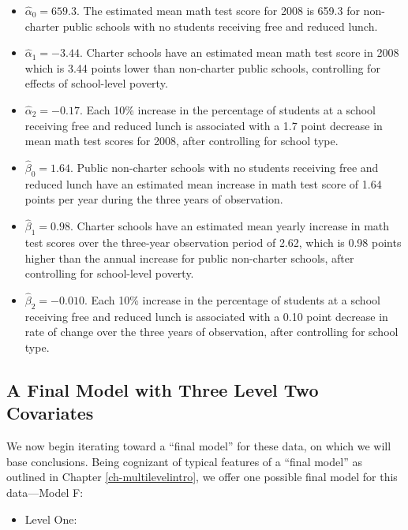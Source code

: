 \documentclass[
]{krantz}
\providecommand{\tightlist}{%
  \setlength{\itemsep}{0pt}\setlength{\parskip}{0pt}}
\begin{document}
\begin{itemize}
\item
  \(\hat{\alpha}_{0}= 659.3.\) The estimated mean math test score for 2008 is 659.3 for non-charter public schools with no students receiving free and reduced lunch.
\item
  \(\hat{\alpha}_{1}= -3.44.\) Charter schools have an estimated mean math test score in 2008 which is 3.44 points lower than non-charter public schools, controlling for effects of school-level poverty.
\item
  \(\hat{\alpha}_{2}= -0.17.\) Each 10\% increase in the percentage of students at a school receiving free and reduced lunch is associated with a 1.7 point decrease in mean math test scores for 2008, after controlling for school type.
\item
  \(\hat{\beta}_{0}= 1.64.\) Public non-charter schools with no students receiving free and reduced lunch have an estimated mean increase in math test score of 1.64 points per year during the three years of observation.
\item
  \(\hat{\beta}_{1}= 0.98.\) Charter schools have an estimated mean yearly increase in math test scores over the three-year observation period of 2.62, which is 0.98 points higher than the annual increase for public non-charter schools, after controlling for school-level poverty.
\item
  \(\hat{\beta}_{2}= -0.010.\) Each 10\% increase in the percentage of students at a school receiving free and reduced lunch is associated with a 0.10 point decrease in rate of change over the three years of observation, after controlling for school type.
\end{itemize}

\hypertarget{modelf9}{%
\subsection{A Final Model with Three Level Two Covariates}\label{modelf9}}

We now begin iterating toward a ``final model'' for these data, on which we will base conclusions. Being cognizant of typical features of a ``final model'' as outlined in Chapter \ref{ch-multilevelintro}, we offer one possible final model for this data---Model F:

\begin{itemize}
\tightlist
\item
  Level One:
\end{itemize}
\end{document}
